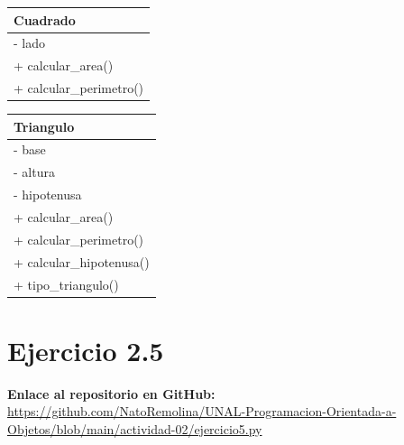 \documentclass[11pt, a4paper]{article}
\newcommand{\clasebox}[3]{%
\begin{center}
\begin{tabular}{|l|}
\hline
\textbf{#1} \\
\hline
#2
\hline
#3
\hline
\end{tabular}
\end{center}
}
\begin{document}
\clasebox{Cuadrado}
{%
- lado \\
}
{%
+ calcular\_area() \\
+ calcular\_perimetro() \\
}

\clasebox{Triangulo}
{%
- base \\
- altura \\
- hipotenusa \\
}
{%
+ calcular\_area() \\
+ calcular\_perimetro() \\
+ calcular\_hipotenusa() \\
+ tipo\_triangulo() \\
}

\newpage
\section{Ejercicio 2.5}

\noindent \textbf{Enlace al repositorio en GitHub:} \\
\url{https://github.com/NatoRemolina/UNAL-Programacion-Orientada-a-Objetos/blob/main/actividad-02/ejercicio5.py}
\end{document}
